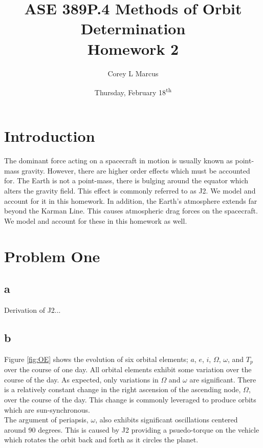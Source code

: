 \documentclass[11pt]{article}
\title{ASE 389P.4 Methods of Orbit Determination \\ Homework 2}
\author{Corey L Marcus} \date{Thursday, February 18\textsuperscript{th}}
\begin{document}
\onehalfspace
\maketitle


\section{Introduction}

The dominant force acting on a spacecraft in motion is usually known as point-mass gravity. However, there are higher order effects which must be accounted for. The Earth is not a point-mass, there is bulging around the equator which alters the gravity field. This effect is commonly referred to as J2. We model and account for it in this homework. In addition, the Earth's atmosphere extends far beyond the Karman Line. This causes atmospheric drag forces on the spacecraft. We model and account for these in this homework as well. \\

\section{Problem One}

\subsection{a}

Derivation of J2...

\subsection{b}

Figure \ref{fig:OE} shows the evolution of six orbital elements; $a$, $e$, $i$, $\Omega$, $\omega$, and $T_p$ over the course of one day. All orbital elements exhibit some variation over the course of the day. As expected, only variations in $\Omega$ and $\omega$ are significant. There is a relatively constant change in the right ascension of the ascending node, $\Omega$, over the course of the day. This change is commonly leveraged to produce orbits which are sun-synchronous. \\

The argument of periapsis, $\omega$, also exhibits significant oscillations centered around 90 degrees. This is caused by J2 providing a psuedo-torque on the vehicle which rotates the orbit back and forth as it circles the planet. \\
\end{document}
